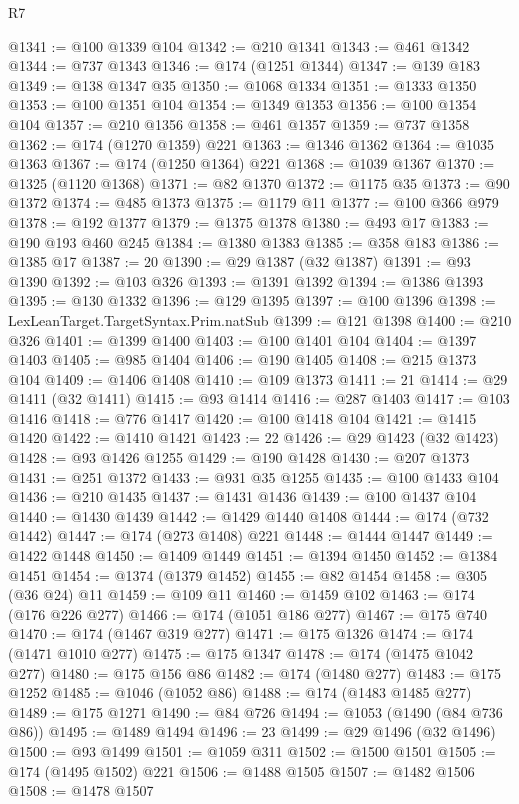 \begin{lexlean}{R7}
\begin{coremodule}
@1341 := @100 @1339 @104
@1342 := @210 @1341
@1343 := @461 @1342
@1344 := @737 @1343
@1346 := @174 (@1251 @1344)
@1347 := @139 @183
@1349 := @138 @1347 @35
@1350 := @1068 @1334
@1351 := @1333 @1350
@1353 := @100 @1351 @104
@1354 := @1349 @1353
@1356 := @100 @1354 @104
@1357 := @210 @1356
@1358 := @461 @1357
@1359 := @737 @1358
@1362 := @174 (@1270 @1359) @221
@1363 := @1346 @1362
@1364 := @1035 @1363
@1367 := @174 (@1250 @1364) @221
@1368 := @1039 @1367
@1370 := @1325 (@1120 @1368)
@1371 := @82 @1370
@1372 := @1175 @35
@1373 := @90 @1372
@1374 := @485 @1373
@1375 := @1179 @11
@1377 := @100 @366 @979
@1378 := @192 @1377
@1379 := @1375 @1378
@1380 := @493 @17
@1383 := @190 @193 @460 @245
@1384 := @1380 @1383
@1385 := @358 @183
@1386 := @1385 @17
@1387 := 20
@1390 := @29 @1387 (@32 @1387)
@1391 := @93 @1390
@1392 := @103 @326
@1393 := @1391 @1392
@1394 := @1386 @1393
@1395 := @130 @1332
@1396 := @129 @1395
@1397 := @100 @1396
@1398 := LexLeanTarget.TargetSyntax.Prim.natSub
@1399 := @121 @1398
@1400 := @210 @326
@1401 := @1399 @1400
@1403 := @100 @1401 @104
@1404 := @1397 @1403
@1405 := @985 @1404
@1406 := @190 @1405
@1408 := @215 @1373 @104
@1409 := @1406 @1408
@1410 := @109 @1373
@1411 := 21
@1414 := @29 @1411 (@32 @1411)
@1415 := @93 @1414
@1416 := @287 @1403
@1417 := @103 @1416
@1418 := @776 @1417
@1420 := @100 @1418 @104
@1421 := @1415 @1420
@1422 := @1410 @1421
@1423 := 22
@1426 := @29 @1423 (@32 @1423)
@1428 := @93 @1426 @1255
@1429 := @190 @1428
@1430 := @207 @1373
@1431 := @251 @1372
@1433 := @931 @35 @1255
@1435 := @100 @1433 @104
@1436 := @210 @1435
@1437 := @1431 @1436
@1439 := @100 @1437 @104
@1440 := @1430 @1439
@1442 := @1429 @1440 @1408
@1444 := @174 (@732 @1442)
@1447 := @174 (@273 @1408) @221
@1448 := @1444 @1447
@1449 := @1422 @1448
@1450 := @1409 @1449
@1451 := @1394 @1450
@1452 := @1384 @1451
@1454 := @1374 (@1379 @1452)
@1455 := @82 @1454
@1458 := @305 (@36 @24) @11
@1459 := @109 @11
@1460 := @1459 @102
@1463 := @174 (@176 @226 @277)
@1466 := @174 (@1051 @186 @277)
@1467 := @175 @740
@1470 := @174 (@1467 @319 @277)
@1471 := @175 @1326
@1474 := @174 (@1471 @1010 @277)
@1475 := @175 @1347
@1478 := @174 (@1475 @1042 @277)
@1480 := @175 @156 @86
@1482 := @174 (@1480 @277)
@1483 := @175 @1252
@1485 := @1046 (@1052 @86)
@1488 := @174 (@1483 @1485 @277)
@1489 := @175 @1271
@1490 := @84 @726
@1494 := @1053 (@1490 (@84 @736 @86))
@1495 := @1489 @1494
@1496 := 23
@1499 := @29 @1496 (@32 @1496)
@1500 := @93 @1499
@1501 := @1059 @311
@1502 := @1500 @1501
@1505 := @174 (@1495 @1502) @221
@1506 := @1488 @1505
@1507 := @1482 @1506
@1508 := @1478 @1507

\end{coremodule}
\end{lexlean}

